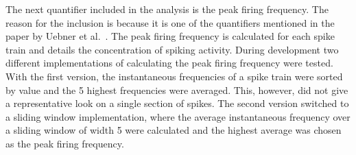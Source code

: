 The next quantifier included in the analysis is the peak firing frequency. The reason for the inclusion is because it is one of the quantifiers mentioned in the paper by Uebner et al.~\cite{roberto}. The peak firing frequency is calculated for each spike train and details the concentration of spiking activity. During development two different implementations of calculating the peak firing frequency were tested. With the first version, the instantaneous frequencies of a spike train were sorted by value and the 5 highest frequencies were averaged. This, however, did not give a representative look on a single section of spikes. The second version switched to a sliding window implementation, where the average instantaneous frequency over a sliding window of width 5 were calculated and the highest average was chosen as the peak firing frequency.
\begin{comment}
At the request of my advisor I calculated the inter spike intervals(ISI) for the spike trains. This can give us a measure of the distribution of spikes in a spike train.\\
Going off of the ISI we can compute the linearity of the inter spike intervals in the form of R2. We want to know if the ISIs tend to increase as the spike trains last longer or decrease or if there is no significant impact. From the start we suspected that the intervals increase as the spike train goes on and calculating the R2 value should give us the confirmation.
\end{comment}



\cleardoublepage
